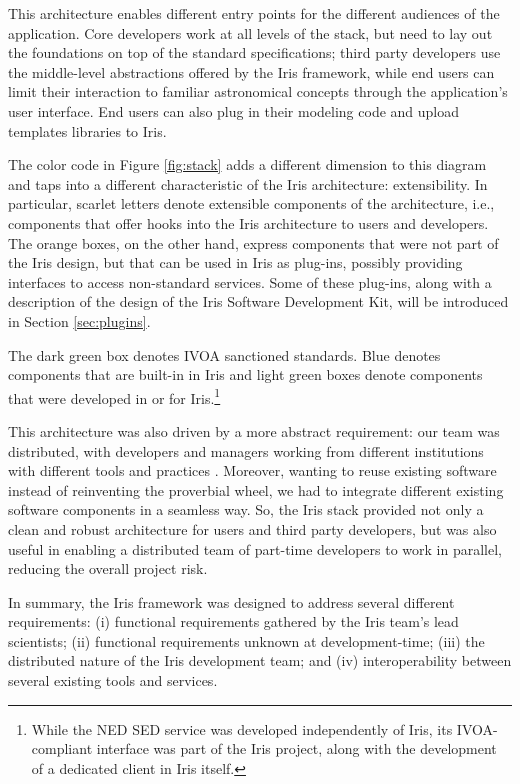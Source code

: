 \documentclass[preprint,authoryear,5p]{elsarticle}
\begin{document}
This architecture enables different entry points for the different audiences of the
application. Core developers work at all levels of the stack, but need to lay
out the foundations on top of the standard specifications; third party
developers use the middle-level abstractions offered by the Iris framework,
while end users can limit their interaction to familiar astronomical concepts
through the application's user interface. End users can also plug in their
modeling code and upload templates libraries to Iris.

The color code in Figure \ref{fig:stack} adds a different dimension to this
diagram and taps into a different characteristic of the Iris architecture:
extensibility. In particular, scarlet letters denote extensible
components of the architecture, i.e., components that offer hooks into the Iris
architecture to users and developers. The orange boxes, on the other hand,
express components that were not part of the Iris design, but that can be
used in Iris as plug-ins, possibly providing interfaces to access
non-standard services. Some of these plug-ins, along with a description of the
design of the Iris Software Development Kit, will be introduced in Section
\ref{sec:plugins}.

The dark green box denotes IVOA sanctioned standards. Blue denotes components
that are built-in in Iris and light green boxes denote components that were developed
in or for Iris.\footnote{While the NED SED service was developed independently of Iris,
its IVOA-compliant interface was part of the Iris project, along with the development of a
dedicated client in Iris itself.}

This architecture was also driven by a more abstract requirement:
our team was
distributed, with developers and managers working from different
institutions with different tools and practices \citep{2012SPIE.8449E..0IE}.
Moreover, wanting to reuse existing software instead of reinventing the
proverbial wheel, we had to integrate different existing software components in
a seamless way. So, the Iris stack provided not only a clean and robust architecture
for users and third party developers, but was also useful in enabling a distributed
team of part-time developers to work in parallel, reducing the overall project risk.

In summary, the Iris framework was designed to address several different
requirements: (i) functional requirements gathered by the Iris team's lead
scientists; (ii) functional requirements unknown at development-time; (iii) the
distributed nature of the Iris development team; and (iv) interoperability between 
several existing tools and services.
\end{document}
